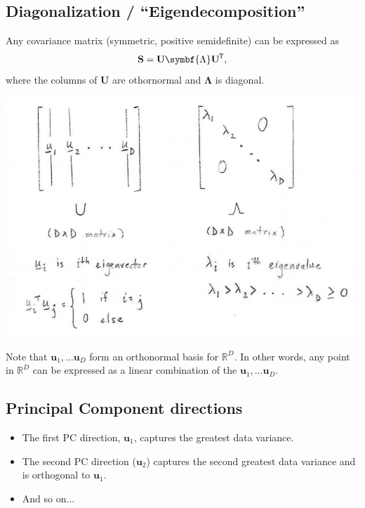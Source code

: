 \documentclass[11pt]{article}
\newcommand*{\tran}{^{\mkern-1.5mu\mathsf{T}}}
\begin{document}
\subsection{Diagonalization / ``Eigendecomposition''}
Any covariance matrix (symmetric, positive semidefinite) can be expressed as
\begin{equation*}
  \mathbf{S} = \mathbf{U} \symbf{\Lambda} \mathbf{U}\tran,
\end{equation*}
where the columns of $\mathbf{U}$ are othornormal and $\symbf{\Lambda}$ is
diagonal.
\begin{center}
  \includegraphics[scale=0.5]{Eigendecomposition.png}
\end{center}

Note that $\mathbf{u}_1,\ldots\mathbf{u}_D$ form an orthonormal basis for
$\mathbb{R}^D$. In other words, any point in $\mathbb{R}^D$ can be expressed as
a linear combination of the $\mathbf{u}_1,\ldots\mathbf{u}_D$.

\subsection{Principal Component directions}
\begin{itemize}
  \item The first PC direction, $\mathbf{u}_1$, captures the greatest data
  variance.

  \item The second PC direction ($\mathbf{u}_2$) captures the second
  greatest data variance and is orthogonal to $\mathbf{u}_1$.

  \item And so on...
\end{itemize}
\end{document}
